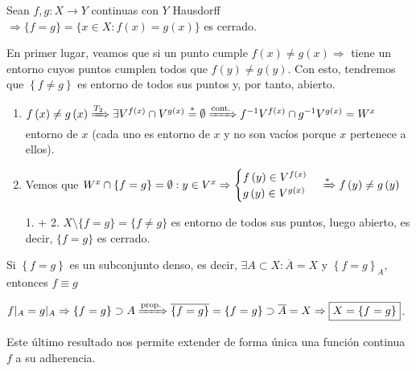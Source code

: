 \begin{prop}
Sean $f, g: X \rightarrow Y$ continuas con $Y$ Hausdorff $\Rightarrow \{f = g\} = \{x \in X : f\left( x \right) = g\left( x \right)\}$ es cerrado.
\end{prop}
\begin{demo}
En primer lugar, veamos que si un punto cumple $f\left( x \right) \neq g\left( x \right) \Rightarrow$ tiene un entorno cuyos puntos cumplen todos que $f\left( y \right) \neq g\left( y \right)$. Con esto, tendremos que $\left\{ f \neq g \right\}$ es entorno de todos sus puntos y, por tanto, abierto.
\begin{enumerate}
    \item $f\left( x \right) \neq g\left( x \right) \xRightarrow{T_2} \exists V^{f\left( x \right)} \cap V^{g\left( x \right)} \stackrel{*}{=} \emptyset \xRightarrow{\text{cont.}} f^{-1}V^{f\left( x \right)} \cap g^{-1}V^{g\left( x \right)} = W^x$ entorno de $x$ (cada uno es entorno de $x$ y no son vacíos porque $x$ pertenece a ellos).

    \item Vemos que $W^x \cap \{f = g\} = \emptyset: y \in V^x \Rightarrow \begin{cases}
        f\left( y \right) \in V^{f\left( x \right)} \\
        g\left( y \right) \in V^{g\left( x \right)} 
    \end{cases} \xRightarrow{*} f\left( y \right) \neq g\left( y \right)$

    \item[1. + 2.] $X\setminus \{f = g\} = \{f \neq g\}$ es entorno de todos sus puntos, luego abierto, es decir, $\{f = g\}$ es cerrado.
\end{enumerate}
\end{demo}

\begin{coro}
Si $\left\{ f = g \right\}$ es un subconjunto denso, es decir, $\exists A \subset X: \overline{A} = X$ y $\left\{ f = g \right\}_A$, entonces $f \equiv g$
\end{coro}
\begin{demo}
$f|_A = g|_A \Rightarrow \{f = g\} \supset A \xRightarrow{\text{prop.}} \overline{\left\{ f = g \right\}} = \{f = g\} \supset \overline{A} = X \Rightarrow \boxed{X = \left\{ f = g \right\}}$.
\end{demo}

\begin{obs}
Este último resultado nos permite extender de forma única una función continua $f$ a su adherencia.
\end{obs}

